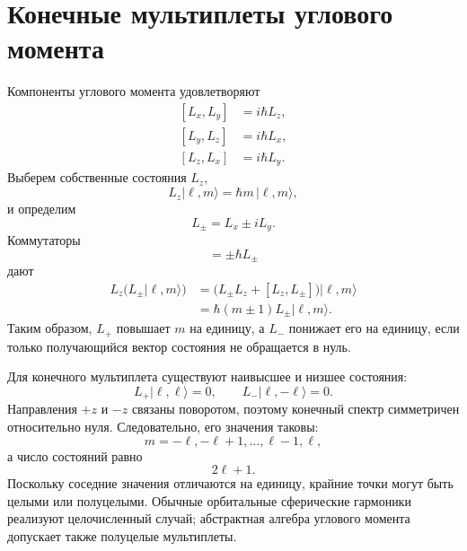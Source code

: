 \section{Конечные мультиплеты углового момента}

Компоненты углового момента удовлетворяют
\begin{equation}
\begin{aligned}
[L_x,L_y]&=i\hbar L_z,\\
[L_y,L_z]&=i\hbar L_x,\\
[L_z,L_x]&=i\hbar L_y.
\end{aligned}
\end{equation}
Выберем собственные состояния \(L_z\),
\begin{equation}
L_z|\ell,m\rangle=\hbar m\,|\ell,m\rangle,
\end{equation}
и определим
\begin{equation}
L_\pm=L_x\pm iL_y.
\end{equation}
Коммутаторы
\begin{equation}
[L_z,L_\pm]=\pm\hbar L_\pm
\end{equation}
дают
\begin{align}
L_z\bigl(L_\pm|\ell,m\rangle\bigr)
&=\bigl(L_\pm L_z+[L_z,L_\pm]\bigr)|\ell,m\rangle \\
&=\hbar(m\pm1)L_\pm|\ell,m\rangle.
\end{align}
Таким образом, \(L_+\) повышает \(m\) на единицу, а \(L_-\) понижает его на единицу, если только получающийся вектор состояния не обращается в нуль.

Для конечного мультиплета существуют наивысшее и низшее состояния:
\begin{equation}
L_+|\ell,\ell\rangle=0,
\qquad
L_-|\ell,-\ell\rangle=0.
\end{equation}
Направления \(+z\) и \(-z\) связаны поворотом, поэтому конечный спектр симметричен относительно нуля. Следовательно, его значения таковы:
\begin{equation}
m=-\ell,-\ell+1,\ldots,\ell-1,\ell,
\end{equation}
а число состояний равно
\begin{equation}
2\ell+1.
\end{equation}
Поскольку соседние значения отличаются на единицу, крайние точки могут быть целыми или полуцелыми. Обычные орбитальные сферические гармоники реализуют целочисленный случай; абстрактная алгебра углового момента допускает также полуцелые мультиплеты.

\begin{classroomqa}
\end{classroomqa}

